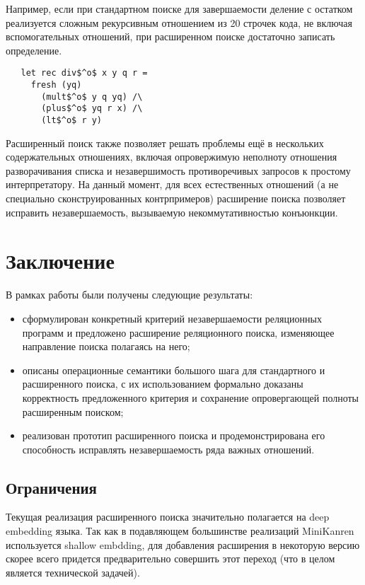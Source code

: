     Например, если при стандартном поиске для завершаемости деление с остатком реализуется сложным рекурсивным отношением из 20 строчек кода, не включая вспомогательных отношений, при расширенном поиске достаточно записать определение.
    
\begin{lstlisting}
   let rec div$^o$ x y q r =
     fresh (yq)
       (mult$^o$ y q yq) /\
       (plus$^o$ yq r x) /\
       (lt$^o$ r y)
\end{lstlisting}

    Расширенный поиск также позволяет решать проблемы ещё в нескольких содержательных отношениях, включая опровержимую неполноту отношения разворачивания списка и незавершимость противоречивых запросов к простому интерпретатору. На данный момент, для всех естественных отношений (а не специально сконструированных контрпримеров) расширение поиска позволяет исправить незавершаемость, вызываемую некоммутативностью конъюнкции.
    
  \section{Заключение}
  
    В рамках работы были получены следующие результаты:
    
    \begin{itemize}
      \item сформулирован конкретный критерий незавершаемости реляционных программ и предложено расширение реляционного поиска, изменяющее направление поиска полагаясь на него;
      \item описаны операционные семантики большого шага для стандартного и расширенного поиска, с их использованием формально доказаны корректность предложенного критерия и сохранение опровергающей полноты расширенным поиском;
      \item реализован прототип расширенного поиска и продемонстрирована его способность исправлять незавершаемость ряда важных отношений.
    \end{itemize}
    
  \subsection{Ограничения}
  
    Текущая реализация расширенного поиска значительно полагается на deep embedding языка. Так как в подавляющем большинстве реализаций MiniKanren используется shallow embdding, для добавления расширения в некоторую версию скорее всего придется предварительно совершить этот переход (что в целом является технической задачей).
    
